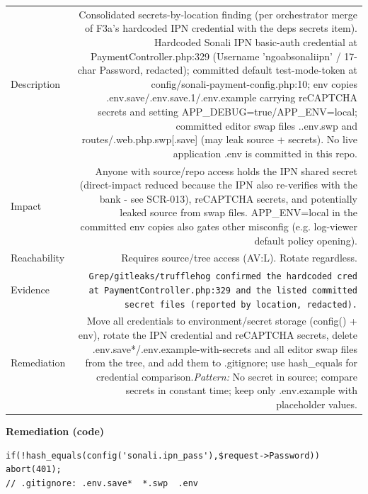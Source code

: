 \documentclass[11pt,a4paper]{article}
\begin{document}
{\renewcommand{\arraystretch}{1.35}%
\begin{tabularx}{\textwidth}{L R}
\toprule
Description & Consolidated secrets-by-location finding (per orchestrator merge of F3a's hardcoded IPN credential with the deps secrets item). Hardcoded Sonali IPN basic-auth credential at PaymentController.php:329 (Username 'ngoabsonaliipn' / 17-char Password, redacted); committed default test-mode-token at config/sonali-payment-config.php:10; env copies .env.save/.env.save.1/.env.example carrying reCAPTCHA secrets and setting APP\_DEBUG=true/APP\_ENV=local; committed editor swap files ..env.swp and routes/.web.php.swp[.save] (may leak source + secrets). No live application .env is committed in this repo. \\
Impact & Anyone with source/repo access holds the IPN shared secret (direct-impact reduced because the IPN also re-verifies with the bank - see SCR-013), reCAPTCHA secrets, and potentially leaked source from swap files. APP\_ENV=local in the committed env copies also gates other misconfig (e.g. log-viewer default policy opening). \\
Reachability & Requires source/tree access (AV:L). Rotate regardless. \\
Evidence & \texttt{\small Grep/gitleaks/trufflehog confirmed the hardcoded cred at PaymentController.php:329 and the listed committed secret files (reported by location, redacted).} \\
Remediation & Move all credentials to environment/secret storage (config() + env), rotate the IPN credential and reCAPTCHA secrets, delete .env.save*/.env.example-with-secrets and all editor swap files from the tree, and add them to .gitignore; use hash\_equals for credential comparison.\newline\emph{Pattern:} No secret in source; compare secrets in constant time; keep only .env.example with placeholder values. \\
\bottomrule
\end{tabularx}}

\vspace{4pt}\noindent\textbf{Remediation (code)}\par
\begin{lstlisting}
if(!hash_equals(config('sonali.ipn_pass'),$request->Password)) abort(401);
// .gitignore: .env.save*  *.swp  .env
\end{lstlisting}
\end{document}
